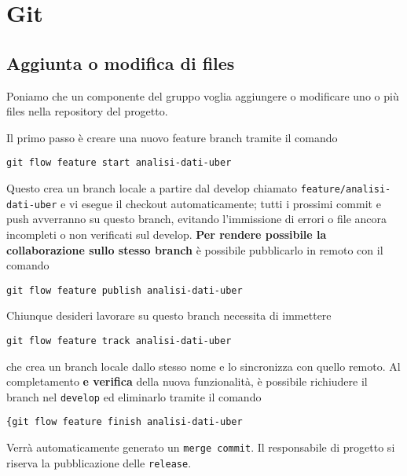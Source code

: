 

\chapter{Git}

\section{Aggiunta o modifica di files}
Poniamo che un componente del gruppo voglia aggiungere o modificare uno o più files nella repository del progetto.

Il primo passo è creare una nuovo feature branch tramite il comando
\begin{lstlisting}
git flow feature start analisi-dati-uber
\end{lstlisting}
Questo crea un branch locale a partire dal develop chiamato \texttt{feature/analisi-dati-uber} e vi esegue il checkout automaticamente; tutti i prossimi commit e push avverranno su questo branch, evitando l'immissione di errori o file ancora incompleti o non verificati sul develop.
\textbf{Per rendere possibile la collaborazione sullo stesso branch} è possibile pubblicarlo in remoto con il comando
\begin{lstlisting}
git flow feature publish analisi-dati-uber
\end{lstlisting}
Chiunque desideri lavorare su questo branch necessita di immettere
\begin{lstlisting}
git flow feature track analisi-dati-uber
\end{lstlisting}
che crea un branch locale dallo stesso nome e lo sincronizza con quello remoto.
Al completamento \textbf{e verifica} della nuova funzionalità, è possibile richiudere il branch nel \texttt{develop} ed eliminarlo tramite il comando
\begin{lstlisting}
{git flow feature finish analisi-dati-uber
\end{lstlisting}
Verrà automaticamente generato un \texttt{merge commit}.
Il responsabile di progetto si riserva la pubblicazione delle \texttt{release}.

